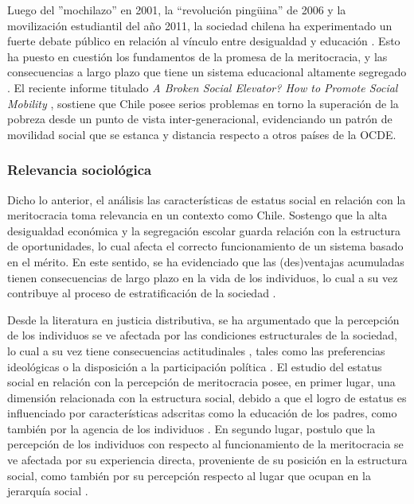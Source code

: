 \documentclass[12pt]{article}
\begin{document}
Luego del ''mochilazo'' en 2001, la ``revolución pingüina'' de 2006 y la movilización estudiantil del año 2011, la sociedad chilena ha experimentado un fuerte debate público en relación al vínculo entre desigualdad y educación  \cite{Bellei2010}. Esto ha puesto en cuestión los fundamentos de la promesa de la meritocracia, y las consecuencias a largo plazo que tiene un sistema educacional altamente segregado \cite{Bellei2015}. El reciente informe titulado \textit{A Broken Social Elevator? How to Promote Social Mobility} \citep{OECD2018}, sostiene que Chile posee serios problemas en torno la superación de la pobreza desde un punto de vista inter-generacional, evidenciando un patrón de movilidad social que se estanca y distancia respecto a otros países de la OCDE. 
	
\subsubsection{Relevancia sociológica}
	
Dicho lo anterior, el análisis las características de estatus social en relación con la meritocracia toma relevancia en un contexto como Chile. Sostengo que la alta desigualdad económica y la segregación escolar guarda relación con la estructura de oportunidades, lo cual afecta el correcto funcionamiento de un sistema basado en el mérito. En este sentido, se ha evidenciado que las (des)ventajas acumuladas tienen consecuencias de largo plazo en la vida de los individuos, lo cual a su vez contribuye al proceso de estratificación de la sociedad \citep{Dannefer2003}. 

Desde la literatura en justicia distributiva, se ha argumentado que la percepción de los individuos se ve afectada por las condiciones estructurales de la sociedad, lo cual a su vez tiene consecuencias actitudinales \citep{Jasso2015}, tales como las preferencias ideológicas o la disposición a la participación política \citep{Castillo2013clivajes}. El estudio del estatus social en relación con la percepción de meritocracia posee, en primer lugar, una dimensión relacionada con la estructura social, debido a que el logro de estatus es influenciado por características adscritas como la educación de los padres, como también por la agencia de los individuos \citep{Goldthorpe2003}. En segundo lugar, postulo que la percepción de los individuos con respecto al funcionamiento de la meritocracia se ve afectada por su experiencia directa, proveniente de su posición en la estructura social, como también por su percepción respecto al lugar que ocupan en la jerarquía social \citep{Evans2004}.    
\end{document}
